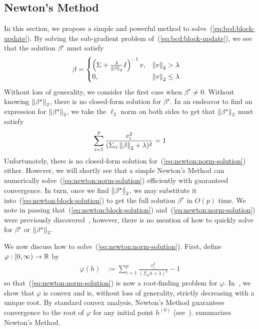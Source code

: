 \subsection{Newton's Method}\label{ssec:newton}

In this section, we propose 
a simple and powerful method to solve~(\ref{eq:bcd:block-update}).
By solving the sub-gradient problem of~(\ref{eq:bcd:block-update}),
we see that the solution $\beta^\star$ must satisfy
\begin{align}
    \beta
    &=
    \begin{cases}
    \left(\Sigma + \frac{\lambda}{\left\|\beta\right\|_2} I\right)^{-1} v ,& \left\|v\right\|_2 > \lambda \\
    0 ,& \left\|v\right\|_2 \leq \lambda
    \end{cases}
    \label{eq:newton:block-solution}
\end{align}
Without loss of generality, we consider the first case when $\beta^\star \neq 0$.
Without knowing $\left\|\beta^\star\right\|_2$, there is no closed-form solution for $\beta^\star$.
In an endeavor to find an expression for $\left\|\beta^\star\right\|_2$,
we take the $\ell_2$ norm on both sides to get that $\left\|\beta^\star\right\|_2$ must satisfy
\begin{align}
    \sum\limits_{i=1}^p
    \frac{v_i^2}{(\Sigma_{ii} \left\|\beta\right\|_2 + \lambda)^2}
    =
    1
    \label{eq:newton:norm-solution}
\end{align}
Unfortunately, there is no closed-form solution for~(\ref{eq:newton:norm-solution}) either.
However, we will shortly see that a simple Newton's Method 
can numerically solve~(\ref{eq:newton:norm-solution}) efficiently with guaranteed convergence.
In turn, once we find $\left\|\beta^\star\right\|_2$, we may substitute it
into~(\ref{eq:newton:block-solution}) to get the full solution $\beta^\star$ in $O(p)$ time.
We note in passing that~(\ref{eq:newton:block-solution}) and~(\ref{eq:newton:norm-solution})
were previously discovered~\citep{sls:2016},
however, there is no mention of how to quickly solve for $\beta^\star$ or $\left\|\beta^\star\right\|_2$.

We now discuss how to solve~(\ref{eq:newton:norm-solution}).
First, define $\varphi : [0, \infty) \to \mathbb{R}$ by
\begin{align}
    \varphi(h)
    &:=
    \sum\limits_{i=1}^p
    \frac{v_i^2}{(\Sigma_{ii} h + \lambda)^2}
    - 1
    \label{eq:varphi-def}
\end{align}
so that~(\ref{eq:newton:norm-solution}) is now a root-finding problem for $\varphi$.
In~, we show that $\varphi$ is 
convex and is, without loss of generality, 
strictly decreasing with a unique root.
By standard convex analysis, Newton's Method guarantees convergence to the root of $\varphi$
for any initial point $h^{(0)}$ (see~).
 summarizes Newton's Method.

